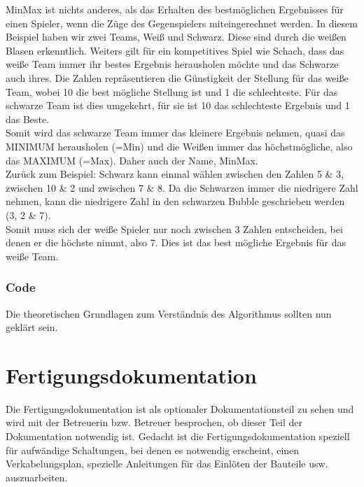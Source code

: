 \documentclass[12pt,a4paper]{article}
\newcommand{\yhbu}[0]{\color{ydkbu}}	%
\begin{document}
{MinMax ist nichts anderes, als das Erhalten des bestmöglichen Ergebnisses für einen Spieler, wenn die Züge des Gegenspielers miteingerechnet werden. In diesem Beispiel haben wir zwei Teams, Weiß und Schwarz. Diese sind durch die weißen Blasen erkenntlich. Weiters gilt für ein kompetitives Spiel wie Schach, dass das weiße Team immer ihr bestes Ergebnis herausholen möchte und das Schwarze auch ihres. Die Zahlen repräsentieren die Günstigkeit der Stellung für das weiße Team, wobei 10 die best mögliche Stellung ist und 1 die schlechteste. Für das schwarze Team ist dies umgekehrt, für sie ist 10 das schlechteste Ergebnis und 1 das Beste. \\
Somit wird das schwarze Team immer das kleinere Ergebnis nehmen, quasi das MINIMUM herausholen (=Min) und die Weißen immer das höchstmögliche, also das MAXIMUM (=Max). Daher auch der Name, MinMax. \\
Zurück zum Beispiel: Schwarz kann einmal wählen zwischen den Zahlen 5 \& 3, zwischen 10 \& 2 und zwischen 7 \& 8. Da die Schwarzen immer die niedrigere Zahl nehmen, kann die niedrigere Zahl in den schwarzen Bubble geschrieben werden (3, 2 \& 7). \\
Somit muss sich der weiße Spieler nur noch zwischen 3 Zahlen entscheiden, bei denen er die höchste nimmt, also 7. Dies ist das best mögliche Ergebnis für das weiße Team.

\subsubsection{Code}
\label{SUBSUBSEC:AICODE}

Die theoretischen Grundlagen zum Verständnis des Algorithmus sollten nun geklärt sein.\\



\clearpage\vfill\newpage{}
\section{\sc Fertigungsdokumentation}
	{\yhbu
	Die Fertigungsdokumentation ist als optionaler Dokumentationsteil zu sehen und
	wird mit der Betreuerin bzw. Betreuer besprochen, ob dieser Teil der Dokumentation
	notwendig ist. Gedacht ist die Fertigungsdokumentation speziell für aufwändige
	Schaltungen, bei denen es notwendig erscheint, einen Verkabelungsplan, spezielle
	Anleitungen für das Einlöten der Bauteile usw. auszuarbeiten.
	}
}
\end{document}
